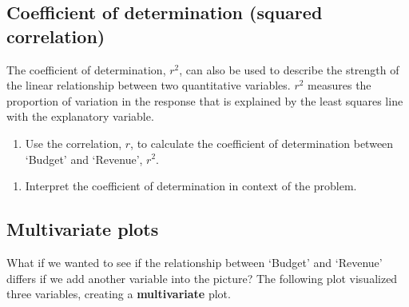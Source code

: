 \documentclass[
]{report}
\providecommand{\tightlist}{%
  \setlength{\itemsep}{0pt}\setlength{\parskip}{0pt}}
\begin{document}
\vspace{.2in}

\newpage

\hypertarget{coefficient-of-determination-squared-correlation}{%
\subsection{Coefficient of determination (squared correlation)}\label{coefficient-of-determination-squared-correlation}}

The coefficient of determination, \(r^2\), can also be used to describe the strength of the linear relationship between two quantitative variables. \(r^2\) measures the proportion of variation in the response that is explained by the least squares line with the explanatory variable.

\begin{enumerate}
\def\labelenumi{\arabic{enumi}.}
\setcounter{enumi}{14}
\tightlist
\item
  Use the correlation, \(r\), to calculate the coefficient of determination between `Budget' and `Revenue', \(r^2\).
\end{enumerate}

\vspace{.4in}

\begin{enumerate}
\def\labelenumi{\arabic{enumi}.}
\setcounter{enumi}{15}
\tightlist
\item
  Interpret the coefficient of determination in context of the problem.
\end{enumerate}

\vspace{.6in}

\hypertarget{multivariate-plots}{%
\subsection{Multivariate plots}\label{multivariate-plots}}

What if we wanted to see if the relationship between `Budget' and `Revenue' differs if we add another variable into the picture? The following plot visualized three variables, creating a \textbf{multivariate} plot.
\end{document}
